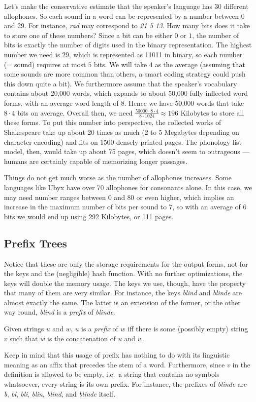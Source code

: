 Let's make the conservative estimate that the speaker's language has 30 different allophones. 
So each sound in a word can be represented by a number between 0 and 29.
For instance, \emph{rad} may correspond to \emph{21 5 13}.
How many bits does it take to store one of these numbers?
Since a bit can be either $0$ or $1$, the number of bits is exactly the number of digits used in the binary representation. 
The highest number we need is $29$, which is represented as 11011 in binary, so each number (= sound) requires at most $5$ bits.
We will take $4$ as the average (assuming that some sounds are more common than others, a smart coding strategy could push this down quite a bit).
We furthermore assume that the speaker's vocabulary contains about 20,000 words, which expands to about 50,000 fully inflected word forms, with an average word length of $8$.
Hence we have 50,000 words that take $8 \cdot 4$ bits on average.
Overall then, we need $\frac{50000 \cdot 8 \cdot 4}{8 \cdot 1024} \approx 196 $ Kilobytes to store all these forms.
To put this number into perspective, the collected works of Shakespeare take up about 20 times as much (2 to 5 Megabytes depending on character encoding) and fits on 1500 densely printed pages.
The phonology list model, then, would take up about 75 pages, which doesn't seem to outrageous --- humans are certainly capable of memorizing longer passages. 

Things do not get much worse as the number of allophones increases.
Some languages like Ubyx have over 70 allophones for consonants alone.
In this case, we may need number ranges between 0 and 80 or even higher, which implies an increase in the maximum number of bits per sound to 7, so with an average of 6 bits we would end up using 292 Kilobytes, or 111 pages.

\subsection{Prefix Trees}

Notice that these are only the storage requirements for the output forms, not for the keys and the (negligible) hash function.
With no further optimizations, the keys will double the memory usage.
The keys we use, though, have the property that many of them are very similar.
For instance, the keys \emph{blind} and \emph{blinde} are almost exactly the same.
The latter is an extension of the former, or the other way round, \emph{blind} is a \emph{prefix} of \emph{blinde}.
%
\begin{definition}[Prefix]
    Given strings $u$ and $w$, $u$ is a \emph{prefix} of $w$ iff there is some (possibly empty) string $v$ such that $w$ is the concatenation of $u$ and $v$.
\end{definition}
%
Keep in mind that this usage of prefix has nothing to do with its linguistic meaning as an affix that precedes the stem of a word.
Furthermore, since $v$ in the definition is allowed to be empty, i.e.\ a string that contains no symbols whatsoever, every string is its own prefix.
For instance, the prefixes of \emph{blinde} are \emph{b}, \emph{bl}, \emph{bli}, \emph{blin}, \emph{blind}, and \emph{blinde} itself.

